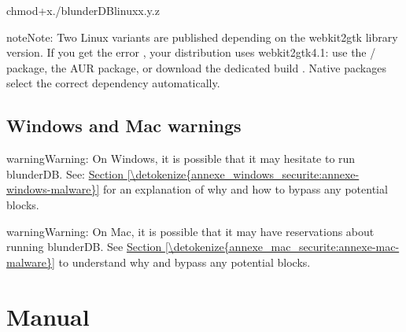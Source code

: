 \documentclass[letterpaper,10pt,english]{sphinxmanual}
\begin{document}
\begin{sphinxVerbatim}[commandchars=\\\{\}]
chmod+x./blunderDB\PYGZhy{}linux\PYGZhy{}x.y.z
\end{sphinxVerbatim}

\begin{sphinxadmonition}{note}{Note:}
\sphinxAtStartPar
Two Linux variants are published depending on the webkit2gtk library version. If you get the error , your distribution uses webkit2gtk\sphinxhyphen{}4.1: use the / package, the AUR package, or download the dedicated build . Native packages select the correct dependency automatically.
\end{sphinxadmonition}


\subsection{Windows and Mac warnings}
\label{\detokenize{telecharge_install:avertissements-windows-et-mac}}
\begin{sphinxadmonition}{warning}{Warning:}
\sphinxAtStartPar
On Windows, it is possible that it may hesitate to run blunderDB. See: \hyperref[\detokenize{annexe_windows_securite:annexe-windows-malware}]{Section \ref{\detokenize{annexe_windows_securite:annexe-windows-malware}}} for an explanation of why and how to bypass any potential blocks.
\end{sphinxadmonition}

\begin{sphinxadmonition}{warning}{Warning:}
\sphinxAtStartPar
On Mac, it is possible that it may have reservations about running blunderDB. See \hyperref[\detokenize{annexe_mac_securite:annexe-mac-malware}]{Section \ref{\detokenize{annexe_mac_securite:annexe-mac-malware}}} to understand why and bypass any potential blocks.
\end{sphinxadmonition}

\sphinxstepscope


\section{Manual}
\label{\detokenize{manuel:manuel}}\label{\detokenize{manuel:id1}}\label{\detokenize{manuel::doc}}
\end{document}
